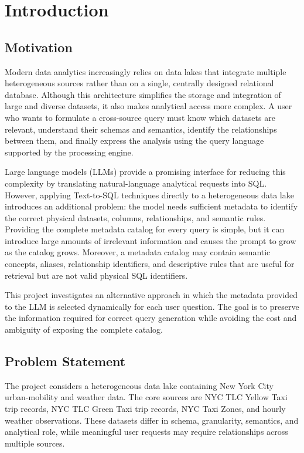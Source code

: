 \section{Introduction}
\label{sec:introduction}

\subsection{Motivation}

Modern data analytics increasingly relies on data lakes that integrate
multiple heterogeneous sources rather than on a single, centrally designed
relational database. Although this architecture simplifies the storage and
integration of large and diverse datasets, it also makes analytical access
more complex. A user who wants to formulate a cross-source query must know
which datasets are relevant, understand their schemas and semantics, identify
the relationships between them, and finally express the analysis using the
query language supported by the processing engine.

Large language models (LLMs) provide a promising interface for reducing this
complexity by translating natural-language analytical requests into SQL.
However, applying Text-to-SQL techniques directly to a heterogeneous data lake
introduces an additional problem: the model needs sufficient metadata to
identify the correct physical datasets, columns, relationships, and semantic
rules. Providing the complete metadata catalog for every query is simple, but
it can introduce large amounts of irrelevant information and causes the prompt
to grow as the catalog grows. Moreover, a metadata catalog may contain
semantic concepts, aliases, relationship identifiers, and descriptive rules
that are useful for retrieval but are not valid physical SQL identifiers.

This project investigates an alternative approach in which the metadata
provided to the LLM is selected dynamically for each user question. The goal
is to preserve the information required for correct query generation while
avoiding the cost and ambiguity of exposing the complete catalog.


\subsection{Problem Statement}

The project considers a heterogeneous data lake containing New York City
urban-mobility and weather data. The core sources are NYC TLC Yellow Taxi trip
records, NYC TLC Green Taxi trip records, NYC Taxi Zones, and hourly weather
observations. These datasets differ in schema, granularity, semantics, and
analytical role, while meaningful user requests may require relationships
across multiple sources.

